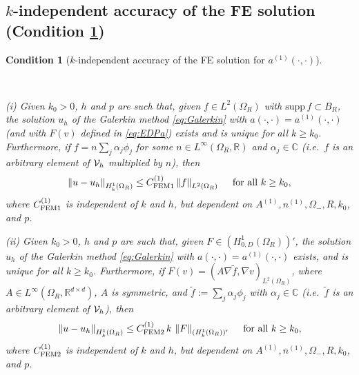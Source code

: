 \documentclass[10pt]{article}%
\newtheorem{condition}[theorem]{Condition}
\numberwithin{equation}{section}
\newcommand{\beq}{\begin{equation}}
\newcommand{\eeq}{\end{equation}}
\newcommand{\cV}{{\cal V}}
\newcommand{\bze}{\mathbf{0}}
\newcommand{\supp}{\mathrm{supp}}
\newcommand{\Rea}{\mathbb{R}}
\newcommand{\Com}{\mathbb{C}}
\newcommand{\Oi}{{\Omega_-}}
\newcommand{\OR}{{\Omega_R}}
\newcommand{\HoDk}{{H^1_{0,D}(\domain_R)}}
\newcommand{\HoDkk}{{H^1_{k}(\domain_R)}}
\newcommand*{\N}[1]{\left\|#1\right\|}
\newcommand{\tfa}{\text{ for all }}
\newcommand{\domain}{\Omega}
\newcommand{\matrixAo}{{\bf A}^{(1)}}
\newcommand{\coeffAo}{A^{(1)}}
\newcommand{\coeffno}{n^{(1)}}
\begin{document}


\subsection{$k$-independent accuracy of the FE solution (Condition \ref{cond:2})}\label{sec:cond2}

\begin{condition}[$k$-independent accuracy of the FE solution for $a^{(1)}(\cdot,\cdot)$]
\label{cond:2}

\

(i) Given $k_0>0$, $h$ and $p$ are such that, given $f\in L^2(\OR)$ with $\supp\, f \subset B_R$, the solution $u_h$ of the Galerkin method \eqref{eq:Galerkin} with $a(\cdot,\cdot)=a^{(1)}(\cdot,\cdot)$ (and with $F(v)$ defined in \eqref{eq:EDPa}) exists and is unique for all $k\geq k_0$. %
Furthermore, if $f= n\sum_j \alpha_j\phi_j$ for some  $n\in L^\infty(\OR,\Rea)$ and $\alpha_j \in \Com$ (i.e.~$f$ is an arbitrary element of $\cV_h$ multiplied by $n$), then
\beq\label{eq:bound3}
\N{u-u_h}_{\HoDkk} \leq C^{(1)}_{\rm FEM1} \N{f}_{L^2(\OR)} \quad\tfa k\geq k_0, 
\eeq
where $C^{(1)}_{\rm FEM1}$  is independent of $k$ and $h$, but dependent on $\coeffAo, \coeffno, \Oi, R, k_0$, and $p$.

(ii) Given $k_0>0$, $h$ and $p$ are such that, given $F\in (\HoDk)'$, the solution $u_h$ of the Galerkin method \eqref{eq:Galerkin} 
with $a(\cdot,\cdot)=a^{(1)}(\cdot,\cdot)$
exists, and is unique for all $k\geq k_0$.
Furthermore, if $F(v)= (A\nabla \widetilde{f},\nabla v)_{L^2(\OR)}$, where $A\in L^\infty(\OR, \Rea^{d\times d})$, $A$ is symmetric, and $\widetilde{f} := \sum_j \alpha_j \phi_j$ with $\alpha_j\in \Com$
 (i.e.~$\widetilde{f}$ is an arbitrary element of $\cV_h$), then
\beq\label{eq:bound4}
\N{u-u_h}_{\HoDkk} \leq C^{(1)}_{\rm FEM2}\,k\, \N{F}_{(\HoDkk)'} \quad\tfa k\geq k_0, 
\eeq
where $C^{(1)}_{\rm FEM2}$  is independent of $k$ and $h$, but dependent on $\coeffAo, \coeffno, \Oi, R, k_0$, and $p$.
\end{condition}
\end{document}
